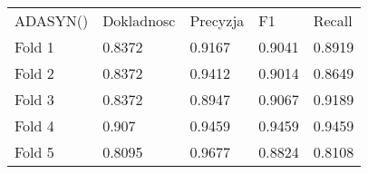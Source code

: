 \begin{tabular}{lllll}
\hline
 ADASYN() & Dokladnosc & Precyzja & F1     & Recall \\
 Fold 1   & 0.8372     & 0.9167   & 0.9041 & 0.8919 \\
 Fold 2   & 0.8372     & 0.9412   & 0.9014 & 0.8649 \\
 Fold 3   & 0.8372     & 0.8947   & 0.9067 & 0.9189 \\
 Fold 4   & 0.907      & 0.9459   & 0.9459 & 0.9459 \\
 Fold 5   & 0.8095     & 0.9677   & 0.8824 & 0.8108 \\
\hline
\end{tabular}